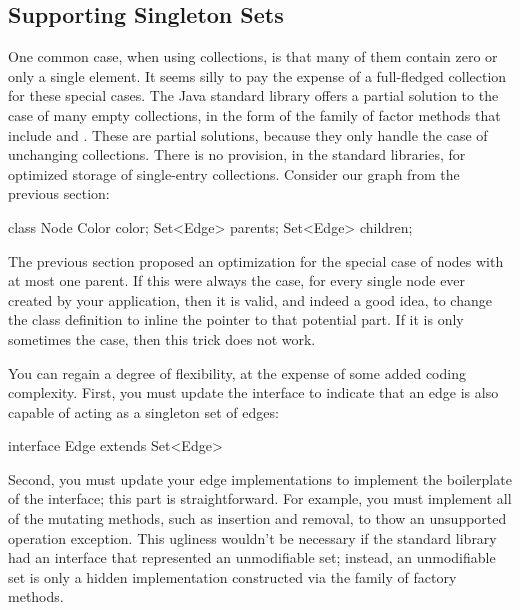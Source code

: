 \subsection{Supporting Singleton Sets}


One common case, when using collections, is that many of them contain zero or
only a single element. It seems silly to pay the expense of a full-fledged
collection for these special cases. The Java standard library offers a
partial solution to the case of many empty collections, in the form of the family
of factor methods that include  and
.
These are partial solutions, because they only handle the case of unchanging
collections. There is no provision, in the standard libraries, for optimized
storage of single-entry collections. Consider our graph from the previous
section:
\begin{shortlisting}
class Node {
	Color color;
	Set<Edge> parents;
	Set<Edge> children;
}
\end{shortlisting}
The previous section proposed an optimization for the special case of nodes with
at most one parent. If this were always the case, for every single node ever
created by your application, then it is valid, and indeed a good idea,
to change the  class definition to inline the pointer to that
potential part. If it is only sometimes the case, then this trick does not work.

You can regain a degree of flexibility, at the expense of some added coding
complexity. First, you must update the  interface to indicate that an
edge is also capable of acting as a singleton set of edges:
\begin{shortlisting}
interface Edge extends Set<Edge> {
}
\end{shortlisting}

Second, you must update your edge implementations to implement the boilerplate of
the  interface; this part is straightforward. For example,
you must implement all of the mutating methods, such as insertion and removal,
to thow an unsupported operation exception. This ugliness wouldn't be necessary
if the standard library had an interface that represented an unmodifiable set;
instead, an unmodifiable set is only a hidden implementation constructed via
the  family of factory methods.

